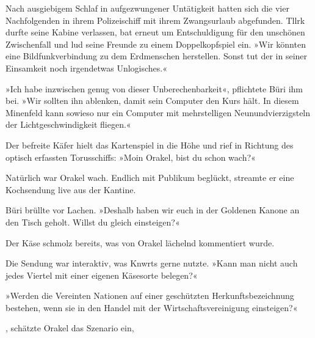 Nach ausgiebigem Schlaf in aufgezwungener Untätigkeit hatten sich die vier Nachfolgenden in ihrem Polizeischiff mit ihrem Zwangsurlaub abgefunden. Tllrk durfte seine Kabine verlassen, bat erneut um Entschuldigung für den unschönen Zwischenfall und lud seine Freunde zu einem Doppelkopfspiel ein. »Wir könnten eine Bildfunkverbindung zu dem Erdmenschen herstellen. Sonst tut der in seiner Einsamkeit noch irgendetwas Unlogisches.«

»Ich habe inzwischen genug von dieser Unberechenbarkeit«, pflichtete Büri ihm bei. »Wir sollten ihn ablenken, damit sein Computer den Kurs hält. In diesem Minenfeld kann sowieso nur ein Computer mit mehrstelligen Neunundvierzigsteln der Lichtgeschwindigkeit fliegen.«

Der befreite Käfer hielt das Kartenspiel in die Höhe und rief in Richtung des optisch erfassten Torusschiffs: »Moin Orakel, bist du schon wach?«

Natürlich war Orakel wach. Endlich mit Publikum beglückt, streamte er eine Kochsendung live aus der Kantine. 

Büri brüllte vor Lachen. »Deshalb haben wir euch in der Goldenen Kanone an den Tisch geholt. Willst du gleich einsteigen?«

 Der Käse schmolz bereits, was von Orakel lächelnd kommentiert wurde. 

Die Sendung war interaktiv, was Knwrts gerne nutzte. »Kann man nicht auch jedes Viertel mit einer eigenen Käsesorte belegen?«


»Werden die Vereinten Nationen auf einer geschützten Herkunftsbezeichnung bestehen, wenn sie in den Handel mit der Wirtschaftsvereinigung einsteigen?«

, schätzte Orakel das Szenario ein, 

